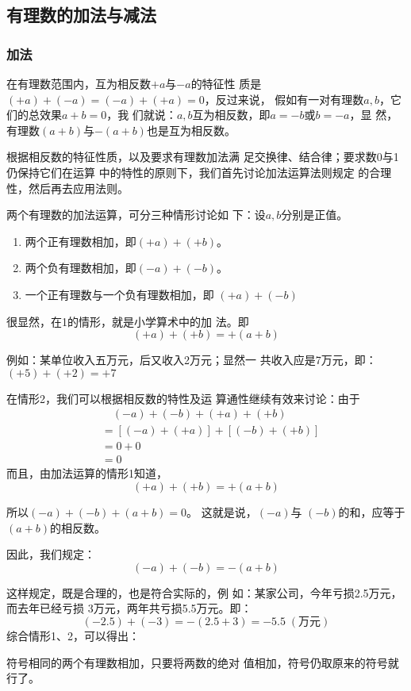 \subsection{有理数的加法与减法}
\subsubsection{加法}

在有理数范围内，互为相反数$+a$与$-a$的特征性
质是$(+a) + (-a)=(-a) + (+a) = 0$，反过来说，
假如有一对有理数$a,  b$，它们的总效果$a+b= 0$，我
们就说：$a,  b$互为相反数，即$a=-b$或$b=-a$，显
然，有理数$(a + b)$与$-(a + b)$也是互为相反数。

根据相反数的特征性质，以及要求有理数加法满
足交换律、结合律；要求数0与1仍保持它们在运算
中的特性的原则下，我们首先讨论加法运算法则规定
的合理性，然后再去应用法则。

两个有理数的加法运算，可分三种情形讨论如
下：设$a,  b$分别是正值。
\begin{enumerate}
	\item 两个正有理数相加，即$(+ a)+(+b)$。
	\item 两个负有理数相加，即$(-a)+(-b)$。
	\item 一个正有理数与一个负有理数相加，即
	$(+a)+(-b)$
\end{enumerate}

很显然，在1的情形，就是小学算术中的加
法。即
\[(+a)+(+b)=+(a+b)\]

例如：某单位收入五万元，后又收入2万元；显然一
共收入应是7万元，即：$(+5)+(+2)=+7$

在情形2，我们可以根据相反数的特性及运
算通性继续有效来讨论：由于
\begin{align*}
&\quad (-a) +(-b) + (+a) + (+b)\\
&=[(-a)+(+a)]+[(-b)+(+b)]
\tag{加法交换、结合律}\\
&=0+0\tag{相反数的特性}\\
&=0\tag{零的运算}
\end{align*}
而且，由加法运算的情形1知道，
\[(+a)+(+b)=+(a+b)\]

所以$( - a) + (- b) + (a + b) = 0$。
这就是说，$( - a)$与
$(-b)$的和，应等于$(a + b)$的相反数。

因此，我们规定：
\[(-a)+(-b)=-(a+b)\]

这样规定，既是合理的，也是符合实际的，例
如：某家公司，今年亏损2.5万元，而去年已经亏损
3万元，两年共亏损5.5万元。即：
\[(-2. 5)+(-3)=-(2.5+3)=-5.5\; (\text{万元})\]
综合情形1、2，可以得出：
\begin{blk}{}
	符号相同的两个有理数相加，只要将两数的绝对
	值相加，符号仍取原来的符号就行了。
\end{blk}

